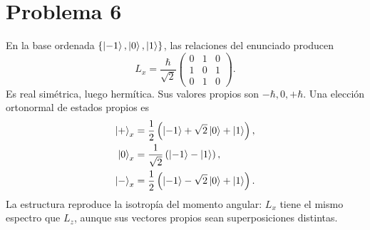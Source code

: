 \documentclass[11pt,a4paper]{article}
\numberwithin{equation}{section}
\newcommand{\hb}{\hbar}
\begin{document}
\section{Problema 6}
En la base ordenada $\{\ket{-1},\ket0,\ket1\}$, las relaciones del enunciado producen
\begin{equation}
L_x=\frac{\hb}{\sqrt2}
\begin{pmatrix}
0&1&0\\1&0&1\\0&1&0
\end{pmatrix}.
\end{equation}
Es real simétrica, luego hermítica. Sus valores propios son $-\hb,0,+\hb$. Una elección ortonormal de estados propios es
\begin{align}
\ket{+}_x&=\frac12\left(\ket{-1}+\sqrt2\ket0+\ket1\right),\\
\ket{0}_x&=\frac1{\sqrt2}\left(\ket{-1}-\ket1\right),\\
\ket{-}_x&=\frac12\left(\ket{-1}-\sqrt2\ket0+\ket1\right).
\end{align}
La estructura reproduce la isotropía del momento angular: $L_x$ tiene el mismo espectro que $L_z$, aunque sus vectores propios sean superposiciones distintas.
\end{document}
